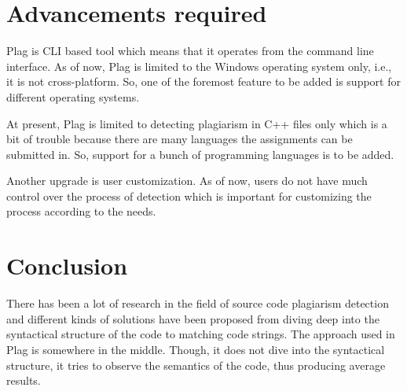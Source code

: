 \documentclass[12pt]{article}
\begin{document}
\section{Advancements required}
Plag is CLI based tool which means that it operates from the command line interface. As of now, Plag is limited to the Windows operating system only, i.e., it is not cross-platform. So, one of the foremost feature to be added is support for different operating systems. \par
At present, Plag is limited to detecting plagiarism in C++ files only which is a bit of trouble because there are many languages the assignments can be submitted in. So, support for a bunch of programming languages is to be added. \par
Another upgrade is user customization. As of now, users do not have much control over the process of detection which is important for customizing the process according to the needs.


\section{Conclusion}
There has been a lot of research in the field of source code plagiarism detection and different kinds of solutions have been proposed from diving deep into the syntactical structure of the code to matching code strings. The approach used in Plag is somewhere in the middle. Though, it does not dive into the syntactical structure, it tries to observe the semantics of the code, thus producing average results.

\newpage



\end{document}

